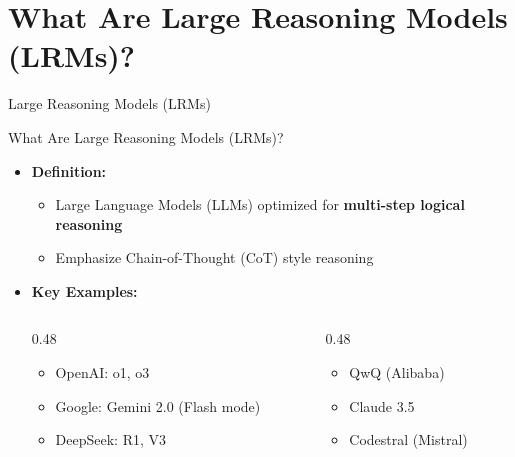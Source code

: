 \section{What Are Large Reasoning Models (LRMs)?}
\begin{frame}{}
    \LARGE Large Reasoning Models (LRMs)
\end{frame}

\begin{frame}[allowframebreaks]{What Are Large Reasoning Models (LRMs)?}
    \begin{itemize}
        \item \textbf{Definition:}
        \begin{itemize}
            \item Large Language Models (LLMs) optimized for \textbf{multi-step logical reasoning}
            \item Emphasize Chain-of-Thought (CoT) style reasoning
        \end{itemize}
        \vspace{1em}
        \item \textbf{Key Examples:}
        \hspace*{1cm}%
        \begin{minipage}{\dimexpr\textwidth-1cm\relax}
            \begin{columns}[T] %
                \begin{column}{0.48\linewidth} %
                    \begin{itemize}
                        \item OpenAI: o1, o3
                        \item Google: Gemini 2.0 (Flash mode)
                        \item DeepSeek: R1, V3
                    \end{itemize}
                \end{column}
                \begin{column}{0.48\linewidth} %
                    \begin{itemize}
                        \item QwQ (Alibaba)
                        \item Claude 3.5
                        \item Codestral (Mistral)

\end{itemize}
\end{column}
\end{columns}
\end{minipage}
\end{itemize}
\end{frame}
